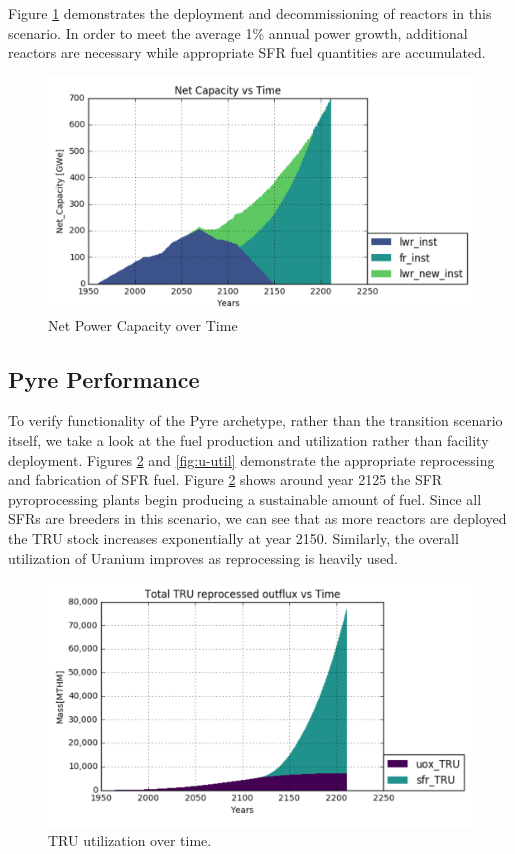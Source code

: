 Figure \ref{fig:net-cap} demonstrates the deployment and decommissioning of reactors in this scenario. In order to meet the average 1\% annual power growth, additional reactors are necessary
while appropriate SFR fuel quantities are accumulated.

\begin{figure} [h]
	\includegraphics[width=\linewidth]{images/transition-netcap}
	\caption{Net Power Capacity over Time}
	\label{fig:net-cap}
\end{figure}

\subsection{Pyre Performance}

To verify functionality of the Pyre archetype, rather than the transition scenario itself, we take a look at the fuel production and utilization rather than facility deployment.
Figures \ref{fig:TRU-util} and \ref{fig:u-util} demonstrate the appropriate reprocessing and fabrication of SFR fuel. Figure \ref{fig:TRU-util} shows around year 2125 the SFR pyroprocessing
plants begin producing a sustainable amount of fuel. Since all SFRs are breeders in this scenario, we can see that as more reactors are deployed the TRU stock increases exponentially at year 2150. Similarly, the overall utilization of Uranium improves as reprocessing is heavily used.

\begin{figure} [h]
	\includegraphics[width=\linewidth]{images/transition-TRUutil}
	\caption{TRU utilization over time.}
	\label{fig:TRU-util}
\end{figure}

